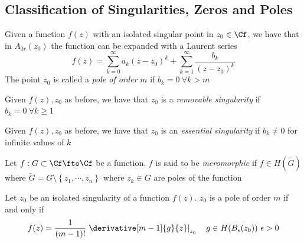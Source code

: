 \documentclass[../mmf.tex]{subfiles}
\begin{document}
\subsection{Classification of Singularities, Zeros and Poles}
\begin{dfn}[Pole]
	Given a function $f(z)$ with an isolated singular point in $z_0\in\Cf$, we have that in $A_{0r}(z_0)$ the function can be expanded with a Laurent series
	\begin{equation*}
		f(z)=\sum_{k=0}^{\infty}a_k(z-z_0)^k+\sum_{k=1}^{\infty}\frac{b_k}{(z-z_0)^k}
	\end{equation*}
	The point $z_0$ is called a \textit{pole of order} $m$ if $b_k=0\ \forall k>m$
\end{dfn}
\begin{dfn}
	Given $f(z),z_0$ as before, we have that $z_0$ is a \textit{removable singularity} if $b_k=0\ \forall k\ge1$
\end{dfn}
\begin{dfn}
	Given $f(z),z_0$ as before, we have that $z_0$ is an \textit{essential singularity} if $b_k\ne0$ for infinite values of $k$
\end{dfn}
\begin{dfn}
	Let $f:G\subset\Cf\fto\Cf$ be a function. $f$ is said to be \textit{meromorphic} if $f\in H(\tilde{G})$ where $\tilde{G}=G\setminus\left\{ z_1,\cdots,z_n \right\}$ where $z_k\in G$ are poles of the function
\end{dfn}
\begin{thm}
	Let $z_0$ be an isolated singularity of a function $f(z)$. $z_0$ is a pole of order $m$ if and only if
	\begin{equation}
		f(z)=\frac{1}{(m-1)!}\left.\derivative[m-1]{g}{z}\right|_{z_0}\quad g\in H(B_\epsilon(z_0))\ \epsilon>0
		\label{eq:pole m}
	\end{equation}
\end{thm}
\end{document}
